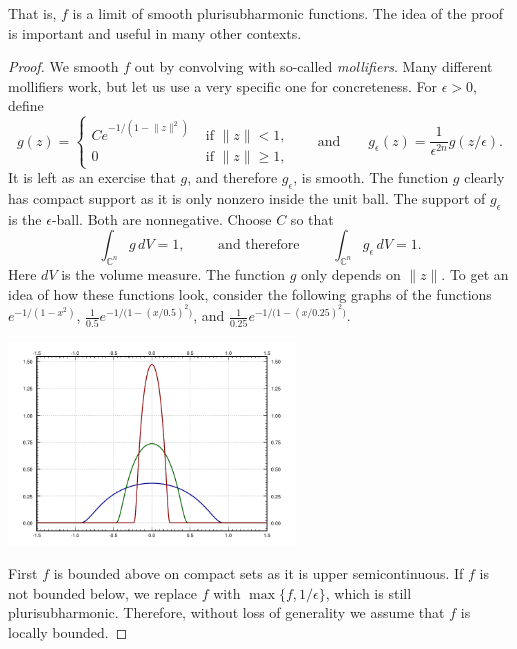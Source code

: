 \documentclass[12pt,openany]{book}
\newcommand{\snorm}[1]{\lVert {#1} \rVert}
\newcommand{\C}{{\mathbb{C}}}
\theoremstyle{plain}
\theoremstyle{remark}
\theoremstyle{definition}
\theoremstyle{exercise}
\theoremstyle{example}
\begin{document}
That is, $f$ is a limit of smooth plurisubharmonic functions.
The idea of the proof is important and useful in many other
contexts.

\begin{proof}
We smooth $f$ out by convolving with so-called
\emph{mollifiers}.  Many different mollifiers 
work, but let us use a very specific one for concreteness.
For $\epsilon > 0$, define 
\begin{equation*}
g(z) = 
\begin{cases}
C e^{-1/(1-\snorm{z}^2)} & \text{ if $\snorm{z} < 1$,}
\\
0 & \text{ if $\snorm{z} \geq 1$,}
\end{cases}
\qquad
\text{and}
\qquad
g_\epsilon(z) = \frac{1}{\epsilon^{2n}} g(z/\epsilon) .
\end{equation*}
It is left as an exercise that $g$, and therefore $g_\epsilon$, is smooth.
The function $g$ clearly has compact
support as it is only nonzero inside the unit ball.  The support of
$g_\epsilon$ is the $\epsilon$-ball.  Both are nonnegative.  Choose $C$ so that
\begin{equation*}
\int_{\C^n} g\, dV = 1 ,
\qquad \text{ and therefore } \qquad
\int_{\C^n} g_\epsilon\, dV = 1 .
\end{equation*}
Here $dV$ is the volume measure.
The function $g$ only depends on $\snorm{z}$.  To get an idea of
how these functions look, consider the following graphs of the
functions $e^{-1/(1-x^2)}$,
$\frac{1}{0.5}e^{-1/\bigl(1-{(x/0.5)}^2\bigr)}$, and
$\frac{1}{0.25}e^{-1/\bigl(1-{(x/0.25)}^2\bigr)}$.

\begin{center}
\includegraphics[width=3.0in]{figures/graph-of-mollifier.pdf}
\end{center}

First $f$ is bounded above on compact sets as it is upper semicontinuous.
If $f$ is not bounded below, we replace $f$ with $\max \{ f , 1/\epsilon
\}$, which is still plurisubharmonic.  Therefore, without loss of generality
we assume that $f$ is locally bounded.


\end{proof}
\end{document}
